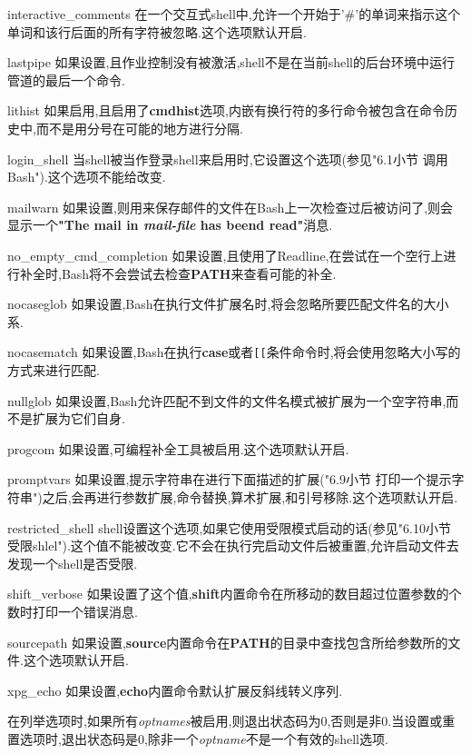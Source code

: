 \documentclass[draft,openany]{book}
\begin{document}
\begin{CJK}{UTF8}{gbsn}
\begin{basedescript}{\desclabelstyle{\nextlinelabel}\desclabelwidth{2.5em}}
    \item[interactive\_comments] 在一个交互式shell中,允许一个开始于'\#'的单词来指示这个单词和该行后面的所有字符被忽略.这个选项默认开启.
    \item[lastpipe] 如果设置,且作业控制没有被激活,shell不是在当前shell的后台环境中运行管道的最后一个命令.
    \item[lithist] 如果启用,且启用了\textbf{cmdhist}选项,内嵌有换行符的多行命令被包含在命令历史中,而不是用分号在可能的地方进行分隔.
    \item[login\_shell] 当shell被当作登录shell来启用时,它设置这个选项(参见"6.1小节 调用Bash").这个选项不能给改变.
    \item[mailwarn] 如果设置,则用来保存邮件的文件在Bash上一次检查过后被访问了,则会显示一个\textbf{"The mail in \emph{mail-file} has beend read"}消息.
    \item[no\_empty\_cmd\_completion] 如果设置,且使用了Readline,在尝试在一个空行上进行补全时,Bash将不会尝试去检查\textbf{PATH}来查看可能的补全.
    \item[nocaseglob] 如果设置,Bash在执行文件扩展名时,将会忽略所要匹配文件名的大小系.
    \item[nocasematch] 如果设置,Bash在执行\textbf{case}或者\verb+[[+条件命令时,将会使用忽略大小写的方式来进行匹配.
    \item[nullglob] 如果设置,Bash允许匹配不到文件的文件名模式被扩展为一个空字符串,而不是扩展为它们自身.
    \item[progcom] 如果设置,可编程补全工具被启用.这个选项默认开启.
    \item[promptvars] 如果设置,提示字符串在进行下面描述的扩展("6.9小节 打印一个提示字符串")之后,会再进行参数扩展,命令替换,算术扩展,和引号移除.这个选项默认开启.
    \item[restricted\_shell] shell设置这个选项,如果它使用受限模式启动的话(参见"6.10小节 受限shlel").这个值不能被改变.它不会在执行完启动文件后被重置,允许启动文件去发现一个shell是否受限.
    \item[shift\_verbose] 如果设置了这个值,\textbf{shift}内置命令在所移动的数目超过位置参数的个数时打印一个错误消息.
    \item[sourcepath] 如果设置,\textbf{source}内置命令在\textbf{PATH}的目录中查找包含所给参数所的文件.这个选项默认开启.
    \item[xpg\_echo] 如果设置,\textbf{echo}内置命令默认扩展反斜线转义序列.
    \end{basedescript}
    \par
    在列举选项时,如果所有\emph{optnames}被启用,则退出状态码为0,否则是非0.当设置或重置选项时,退出状态码是0,除非一个\emph{optname}不是一个有效的shell选项.


\end{CJK}
\end{document}
